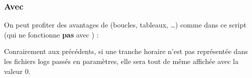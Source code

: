 \subsubsection{Avec }
On peut profiter des avantages de \bash (boucles, tableaux, \ldots) com\-me dans ce script (qui ne fonctionne \textbf{pas} avec \sh) :



Conrairement aux précédents, si une tranche horaire n'est pas représentée dans les fichiers logs passés en paramètres, elle sera tout de même affichée avec la valeur 0.
